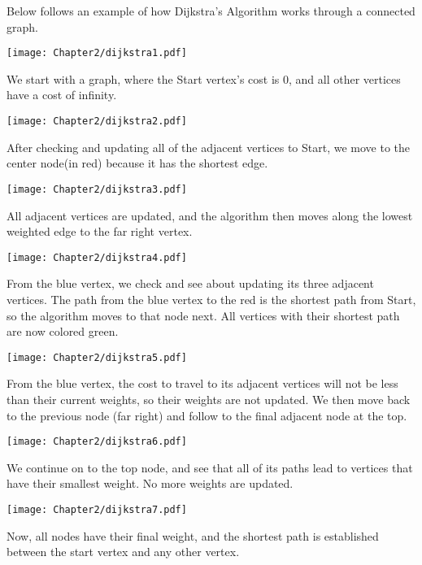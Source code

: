 Below follows an example of how Dijkstra's Algorithm works through a connected graph.

\begin{center}
\texttt{[image: Chapter2/dijkstra1.pdf]}
\end{center}
We start with a graph, where the Start vertex's cost is 0, and all other vertices have a cost of infinity.

\begin{center}
\texttt{[image: Chapter2/dijkstra2.pdf]}
\end{center}
After checking and updating all of the adjacent vertices to Start, we move to the center node(in red) because it has the shortest edge.

\begin{center}
\texttt{[image: Chapter2/dijkstra3.pdf]}
\end{center}
All adjacent vertices are updated, and the algorithm then moves along the lowest weighted edge to the far right vertex.


\begin{center}
\texttt{[image: Chapter2/dijkstra4.pdf]}
\end{center}
From the blue vertex, we check and see about updating its three adjacent vertices. The path from the blue vertex to the red is the shortest path from Start, so the algorithm moves to that node next. All vertices with their shortest path are now colored green. 

\begin{center}
\texttt{[image: Chapter2/dijkstra5.pdf]}
\end{center}
From the blue vertex, the cost to travel to its adjacent vertices will not be less than their current weights, so their weights are not updated. We then move back to the previous node (far right) and follow to the final adjacent node at the top.

\begin{center}
\texttt{[image: Chapter2/dijkstra6.pdf]}
\end{center}
We continue on to the top node, and see that all of its paths lead to vertices that have their smallest weight. No more weights are updated.

\begin{center}
\texttt{[image: Chapter2/dijkstra7.pdf]}
\end{center}
Now, all nodes have their final weight, and the shortest path is established between the start vertex and any other vertex.

